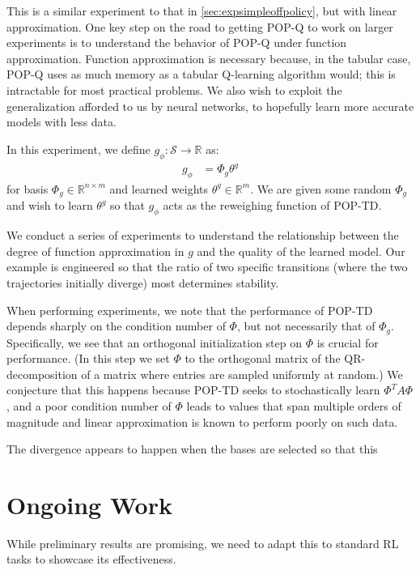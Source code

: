 This is a similar experiment to that in \cref{sec:expsimpleoffpolicy}, but with linear approximation. One key step on the road to getting POP-Q to work on larger experiments is to understand the behavior of POP-Q under function approximation. Function approximation is necessary because, in the tabular case, POP-Q uses as much memory as a tabular Q-learning algorithm would; this is intractable for most practical problems. We also wish to exploit the generalization afforded to us by neural networks, to hopefully learn more accurate models with less data.

In this experiment, we define $g_\phi : \mathcal S \to \mathbb R$ as:
\begin{align}
  g_\phi & = \Phi_g \theta^g
\end{align}
for basis $\Phi_g \in \mathbb R^{n\times m}$ and learned weights $\theta^g \in \mathbb R^{m}$. We are given some random $\Phi_g$ and wish to learn $\theta^g$ so that $g_\phi$ acts as the reweighing function of POP-TD.

We conduct a series of experiments to understand the relationship between the degree of function approximation in $g$ and the quality of the learned model. Our example is engineered so that the ratio of two specific transitions (where the two trajectories initially diverge) most determines stability.

When performing experiments, we note that the performance of POP-TD depends sharply on the condition number of $\Phi$, but not necessarily that of $\Phi_g$. Specifically, we see that an orthogonal initialization step on $\Phi$ is crucial for performance. (In this step we set $\Phi$ to the orthogonal matrix of the QR-decomposition of a matrix where entries are sampled uniformly at random.)
We conjecture that this happens because POP-TD seeks to stochastically learn $\Phi^T A \Phi$, and a poor condition number of $\Phi$ leads to values that span multiple orders of magnitude and linear approximation is known to perform poorly on such data.


The divergence appears to happen when the bases are selected so that this 


\section{Ongoing Work}

While preliminary results are promising, we need to adapt this to standard RL tasks to showcase its effectiveness.


